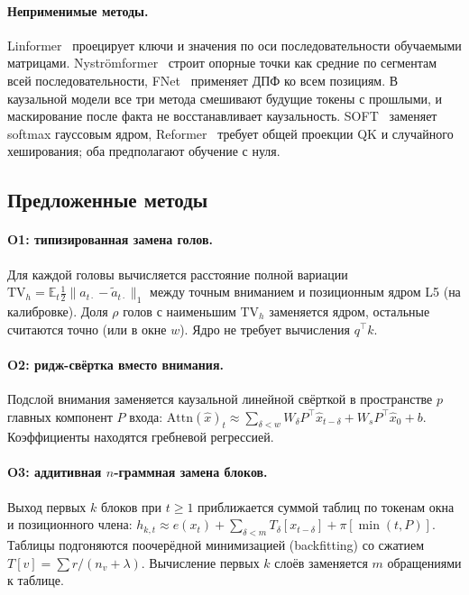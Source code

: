 \paragraph{Неприменимые методы.}
Linformer~\cite{wang2020linformer} проецирует ключи и значения по оси
последовательности обучаемыми матрицами. Nyströmformer~\cite{xiong2021nystrom}
строит опорные точки как средние по сегментам всей
последовательности, FNet~\cite{leethorp2022fnet} применяет ДПФ ко всем
позициям. В каузальной модели все три метода смешивают будущие токены
с прошлыми, и маскирование после факта не восстанавливает
каузальность. SOFT~\cite{lu2021soft} заменяет softmax гауссовым ядром,
Reformer~\cite{kitaev2020reformer} требует общей проекции QK и
случайного хеширования; оба предполагают обучение с нуля.

\subsection{Предложенные методы}

\paragraph{O1: типизированная замена голов.}
Для каждой головы вычисляется расстояние полной вариации
$\mathrm{TV}_h=\mathbb E_t\tfrac12\|a_{t\cdot}-\tilde a_{t\cdot}\|_1$ между
точным вниманием и позиционным ядром L5 (на калибровке). Доля $\rho$
голов с наименьшим $\mathrm{TV}_h$ заменяется ядром, остальные считаются
точно (или в окне $w$). Ядро не требует вычисления $q^\top k$.

\paragraph{O2: ридж-свёртка вместо внимания.}
Подслой внимания заменяется каузальной линейной свёрткой в пространстве
$p$ главных компонент $P$ входа:
$\mathrm{Attn}(\hat x)_t\approx\sum_{\delta<w}W_\delta P^\top\hat x_{t-\delta}+W_sP^\top\hat x_0+b$.
Коэффициенты находятся гребневой регрессией.

\paragraph{O3: аддитивная $n$-граммная замена блоков.}
Выход первых $k$ блоков при $t\ge1$ приближается суммой таблиц по
токенам окна и позиционного члена:
$h_{k,t}\approx e(x_t)+\sum_{\delta<m}T_\delta[x_{t-\delta}]+\pi[\min(t,P)]$.
Таблицы подгоняются поочерёдной минимизацией (backfitting) со сжатием
$T[v]=\sum r/(n_v+\lambda)$. Вычисление первых $k$ слоёв заменяется $m$
обращениями к таблице.


